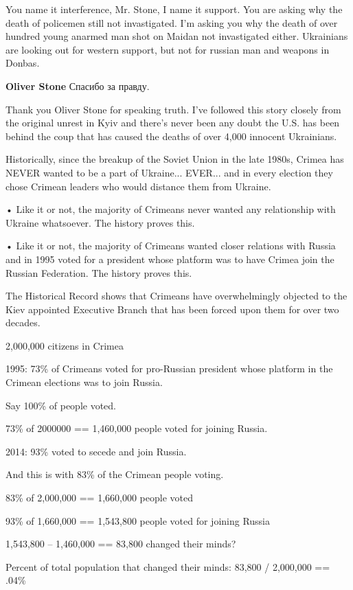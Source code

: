 \begin{itemize}

You name it interference, Mr. Stone, I name it support. You are asking why the
death of policemen still not invastigated. I'm asking you why the death of over
hundred young anarmed man shot on Maidan not invastigated either. Ukrainians
are looking out for western support, but not for russian man and weapons in
Donbas.

\textbf{Oliver Stone} Спасибо за правду.


Thank you Oliver Stone for speaking truth. I've followed this story closely
from the original unrest in Kyiv and there's never been any doubt the U.S. has
been behind the coup that has caused the deaths of over 4,000 innocent
Ukrainians.

Historically, since the breakup of the Soviet Union in the late 1980s, Crimea
has NEVER wanted to be a part of Ukraine... EVER... and in every election they
chose Crimean leaders who would distance them from Ukraine.

• Like it or not, the majority of Crimeans never wanted any relationship with
Ukraine whatsoever. The history proves this.

• Like it or not, the majority of Crimeans wanted closer relations with Russia
and in 1995 voted for a president whose platform was to have Crimea join the
Russian Federation. The history proves this.

The Historical Record shows that Crimeans have overwhelmingly objected to the
Kiev appointed Executive Branch that has been forced upon them for over two
decades.

2,000,000 citizens in Crimea

1995: 73\% of Crimeans voted for pro-Russian president whose platform in the
Crimean elections was to join Russia.

Say 100\% of people voted.

73\% of 2000000 == 1,460,000 people voted for joining Russia.

2014: 93\% voted to secede and join Russia.

And this is with 83\% of the Crimean people voting.

83\% of 2,000,000 == 1,660,000 people voted

93\% of 1,660,000 == 1,543,800 people voted for joining Russia

1,543,800 – 1,460,000 == 83,800 changed their minds?

Percent of total population that changed their minds: 83,800 / 2,000,000 == .04\%


\end{itemize}
